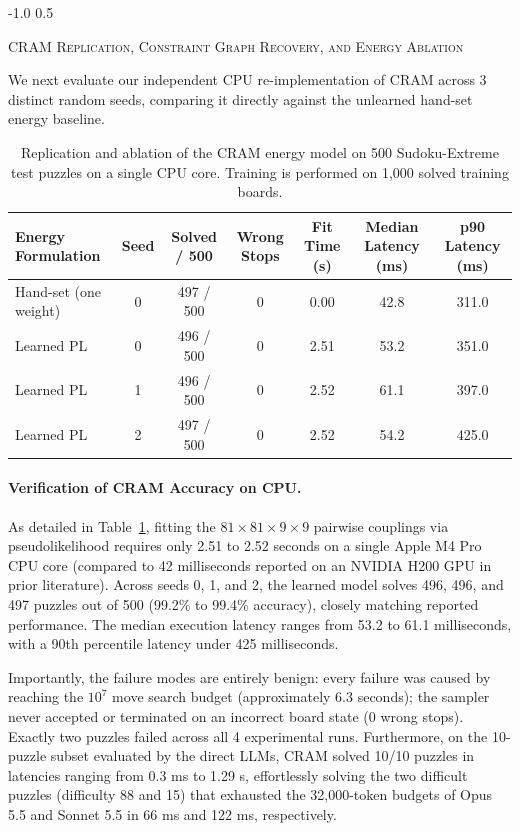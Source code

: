 \documentclass{article} %
\makeatletter
\renewcommand{\subsection}{\@startsection{subsection}{2}{\z@}%
  {-1.0\baselineskip}%
  {0.5\baselineskip}%
  {\normalfont\fontsize{10}{11}\selectfont\raggedright\scshape}}
\makeatother
\begin{document}
\subsection{\textsc{CRAM Replication, Constraint Graph Recovery, and Energy Ablation}}
\label{sec:cram_results}

We next evaluate our independent CPU re-implementation of CRAM across 3 distinct random seeds, comparing it directly against the unlearned hand-set energy baseline.

\begin{table}[t]
\caption{Replication and ablation of the CRAM energy model on 500 Sudoku-Extreme test puzzles on a single CPU core. Training is performed on 1,000 solved training boards.}
\label{tab:cram_results}
\begin{center}
\begin{tabular}{lcccccc}
\toprule
\textbf{Energy Formulation} & \textbf{Seed} & \textbf{Solved / 500} & \textbf{Wrong Stops} & \textbf{Fit Time (s)} & \textbf{Median Latency (ms)} & \textbf{p90 Latency (ms)} \\
\midrule
Hand-set (one weight) & 0 & 497 / 500 & 0 & 0.00 & 42.8 & 311.0 \\
Learned PL & 0 & 496 / 500 & 0 & 2.51 & 53.2 & 351.0 \\
Learned PL & 1 & 496 / 500 & 0 & 2.52 & 61.1 & 397.0 \\
Learned PL & 2 & 497 / 500 & 0 & 2.52 & 54.2 & 425.0 \\
\bottomrule
\end{tabular}
\end{center}
\end{table}

\paragraph{Verification of CRAM Accuracy on CPU.}
As detailed in Table~\ref{tab:cram_results}, fitting the $81 \times 81 \times 9 \times 9$ pairwise couplings via pseudolikelihood requires only 2.51 to 2.52 seconds on a single Apple M4 Pro CPU core (compared to 42 milliseconds reported on an NVIDIA H200 GPU in prior literature). Across seeds 0, 1, and 2, the learned model solves 496, 496, and 497 puzzles out of 500 (99.2\% to 99.4\% accuracy), closely matching reported performance. The median execution latency ranges from 53.2 to 61.1 milliseconds, with a 90th percentile latency under 425 milliseconds.

Importantly, the failure modes are entirely benign: every failure was caused by reaching the $10^7$ move search budget (approximately 6.3 seconds); the sampler never accepted or terminated on an incorrect board state (0 wrong stops). Exactly two puzzles failed across all 4 experimental runs. Furthermore, on the 10-puzzle subset evaluated by the direct LLMs, CRAM solved 10/10 puzzles in latencies ranging from 0.3 ms to 1.29 s, effortlessly solving the two difficult puzzles (difficulty 88 and 15) that exhausted the 32,000-token budgets of Opus 5.5 and Sonnet 5.5 in 66 ms and 122 ms, respectively.
\end{document}
